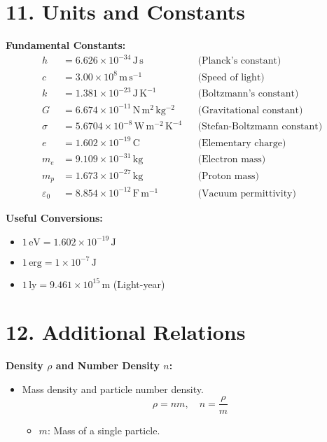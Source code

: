 \documentclass{article}
\begin{document}
\section*{11. Units and Constants}

\textbf{Fundamental Constants:}
\begin{align*}
    h             & = 6.626 \times 10^{-34} \, \mathrm{J\,s}              &  & \text{(Planck's constant)}         \\
    c             & = 3.00 \times 10^8 \, \mathrm{m\,s^{-1}}              &  & \text{(Speed of light)}            \\
    k             & = 1.381 \times 10^{-23} \, \mathrm{J\,K^{-1}}         &  & \text{(Boltzmann's constant)}      \\
    G             & = 6.674 \times 10^{-11} \, \mathrm{N\,m^2\,kg^{-2}}   &  & \text{(Gravitational constant)}    \\
    \sigma        & = 5.6704 \times 10^{-8} \, \mathrm{W\,m^{-2}\,K^{-4}} &  & \text{(Stefan-Boltzmann constant)} \\
    e             & = 1.602 \times 10^{-19} \, \mathrm{C}                 &  & \text{(Elementary charge)}         \\
    m_e           & = 9.109 \times 10^{-31} \, \mathrm{kg}                &  & \text{(Electron mass)}             \\
    m_p           & = 1.673 \times 10^{-27} \, \mathrm{kg}                &  & \text{(Proton mass)}               \\
    \varepsilon_0 & = 8.854 \times 10^{-12} \, \mathrm{F\,m^{-1}}         &  & \text{(Vacuum permittivity)}
\end{align*}

\textbf{Useful Conversions:}
\begin{itemize}
    \item \( 1 \, \mathrm{eV} = 1.602 \times 10^{-19} \, \mathrm{J} \)
    \item \( 1 \, \mathrm{erg} = 1 \times 10^{-7} \, \mathrm{J} \)
    \item \( 1 \, \mathrm{ly} = 9.461 \times 10^{15} \, \mathrm{m} \) \quad (Light-year)
\end{itemize}

\section*{12. Additional Relations}

\textbf{Density \( \rho \) and Number Density \( n \):}
\begin{itemize}
    \item Mass density and particle number density.
          \[
              \rho = n m, \quad n = \frac{\rho}{m}
          \]
          \begin{itemize}
              \item \( m \): Mass of a single particle.
          \end{itemize}
\end{itemize}
\end{document}

